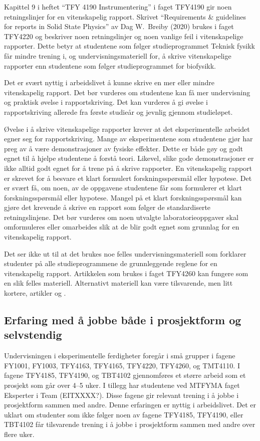 \documentclass{article}
\begin{document}
Kapittel 9 i heftet ``TFY 4190 Instrumentering'' i faget TFY4190 gir noen retningslinjer for en vitenskapelig rapport. Skrivet ``Requirements \& guidelines for reports in Solid State Physics'' av Dag W.~Breiby (2020) brukes i faget TFY4220 og beskriver noen retningslinjer og noen vanlige feil i vitenskapelige rapporter. Dette betyr at studentene som følger studieprogrammet Teknisk fysikk får mindre trening i, og undervisningsmateriell for, å skrive vitenskapelige rapporter enn studentene som følger studieprogrammet for biofysikk.

Det er svært nyttig i arbeidslivet å kunne skrive en mer eller mindre vitenskapelig rapport.
Det bør vurderes om studentene kan få mer undervisning og praktisk øvelse i rapportskriving. Det kan vurderes å gi øvelse i rapportskriving allerede fra første studieår og jevnlig gjennom studieløpet.

Øvelse i å skrive vitenskapelige rapporter krever at det eksperimentelle arbeidet egner seg for rapportskriving. Mange av eksperimentene som studentene gjør har preg av å være demonstrasjoner av fysiske effekter. Dette er både gøy og godt egnet til å hjelpe studentene å forstå teori. Likevel, slike gode demonstrasjoner er ikke alltid godt egnet for å trene på å skrive rapporter. En vitenskapelig rapport er skrevet for å besvare et klart formulert forskningsspørsmål eller hypotese. Det er svært få, om noen, av de oppgavene studentene får som formulerer et klart forskningsspørsmål eller hypotese. Mangel på et klart forskningsspørsmål kan gjøre det krevende å skrive en rapport som følger de standardiserte retningslinjene. Det bør vurderes om noen utvalgte laboratorieoppgaver skal omformuleres eller omarbeides slik at de blir godt egnet som grunnlag for en vitenskapelig rapport.

Det ser ikke ut til at det brukes noe felles undervisningsmateriell som forklarer studenter på alle studieprogrammene de grunnleggende reglene for en vitenskapelig rapport. Artikkelen som brukes i faget TFY4260 kan fungere som en slik felles materiell. Alternativt materiell kan være tilsvarende, men litt kortere, artikler \cite{Lapin1994} og \cite{Senturia2003}.

\subsection{Erfaring med å jobbe både i prosjektform og selvstendig}
Undervisningen i eksperimentelle ferdigheter foregår i små grupper i fagene FY1001, FY1003, TFY4163, TFY4165, TFY4220, TFY4260, og TMT4110. I fagene TFY4185, TFY4190, og TBT4102 gjennomføres et større arbeid som et prosjekt som går over 4--5 uker. I tillegg har studentene ved MTFYMA faget Eksperter i Team (EITXXXX?). Disse fagene gir relevant trening i å jobbe i prosjektform sammen med andre. Denne erfaringen er nyttig i arbeidslivet.
Det er uklart om studenter som ikke følger noen av fagene TFY4185, TFY4190, eller TBT4102 får tilsvarende trening i å jobbe i prosjektform sammen med andre over flere uker.
\end{document}
